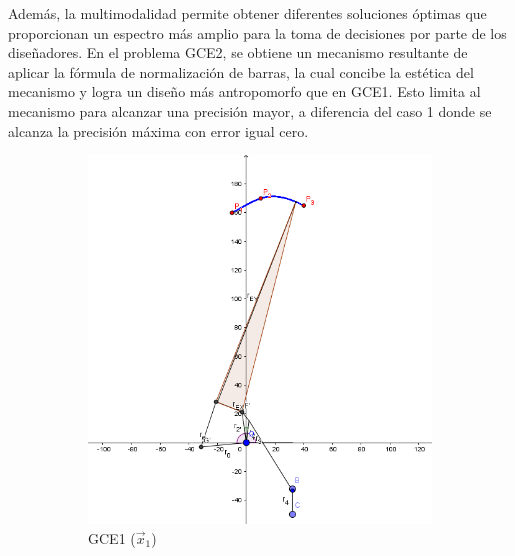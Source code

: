  Además, la multimodalidad permite obtener diferentes soluciones óptimas que proporcionan un espectro más amplio para la toma de decisiones por parte de los diseñadores. En el problema GCE2, se obtiene un mecanismo resultante de aplicar la fórmula de normalización de barras, la cual concibe la estética del mecanismo y logra un diseño más antropomorfo que en GCE1. Esto limita al mecanismo para alcanzar una precisión mayor, a diferencia del caso 1 donde se alcanza la precisión máxima con error igual cero.
 

\begin{figure}[p]
	\centering
	
	\captionsetup{width=.85\linewidth}
	\hspace{1cm}
	\begin{subfigure}[b]{0.45\linewidth}
		\includegraphics[width=\linewidth]{Figures/GCE1}
		\caption{GCE1 ($\vec{x}_1$)} \label{fig:G1} 
	\end{subfigure}
	\begin{subfigure}[b]{0.45\linewidth}

\end{subfigure}
\end{figure}
